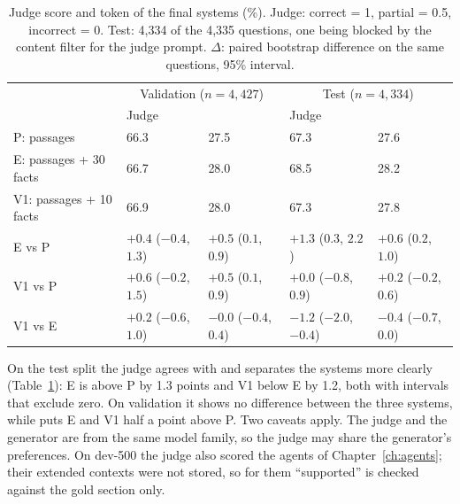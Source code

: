 \begin{table}[ht]
    \centering
    \caption{Judge score and token \fone{} of the final systems (\%). Judge: correct = 1,
    partial = 0.5, incorrect = 0. Test: 4{,}334 of the 4{,}335 questions, one being blocked by the
    content filter for the judge prompt. $\Delta$: paired bootstrap difference on the same
    questions, 95\% interval.}
    \label{tab:graphrag:judge}
    \small
    \setlength{\tabcolsep}{4pt}
    \begin{tabular}{lllll}
        \toprule
        & \multicolumn{2}{c}{Validation ($n = 4{,}427$)} & \multicolumn{2}{c}{Test ($n = 4{,}334$)} \\
        & Judge & \fone{} & Judge & \fone{} \\
        \midrule
        P: passages             & 66.3 & 27.5 & 67.3 & 27.6 \\
        E: passages + 30 facts  & 66.7 & 28.0 & 68.5 & 28.2 \\
        V1: passages + 10 facts & 66.9 & 28.0 & 67.3 & 27.8 \\
        \midrule
        E vs P  & $+0.4$ ($-0.4$, $1.3$) & $+0.5$ ($0.1$, $0.9$)   & $+1.3$ ($0.3$, $2.2$)   & $+0.6$ ($0.2$, $1.0$) \\
        V1 vs P & $+0.6$ ($-0.2$, $1.5$) & $+0.5$ ($0.1$, $0.9$)   & $+0.0$ ($-0.8$, $0.9$)  & $+0.2$ ($-0.2$, $0.6$) \\
        V1 vs E & $+0.2$ ($-0.6$, $1.0$) & $-0.0$ ($-0.4$, $0.4$)  & $-1.2$ ($-2.0$, $-0.4$) & $-0.4$ ($-0.7$, $0.0$) \\
        \bottomrule
    \end{tabular}
\end{table}

On the test split the judge agrees with \fone{} and separates the systems more clearly
(Table~\ref{tab:graphrag:judge}): E is above P by 1.3 points and V1 below E by 1.2, both with
intervals that exclude zero. On validation it shows no difference between the three systems,
while \fone{} puts E and V1 half a point above P. Two caveats apply. The judge and the generator
are from the same model family, so the judge may share the generator's preferences. On dev-500
the judge also scored the agents of Chapter~\ref{ch:agents}; their extended contexts were not
stored, so for them ``supported'' is checked against the gold section only.
